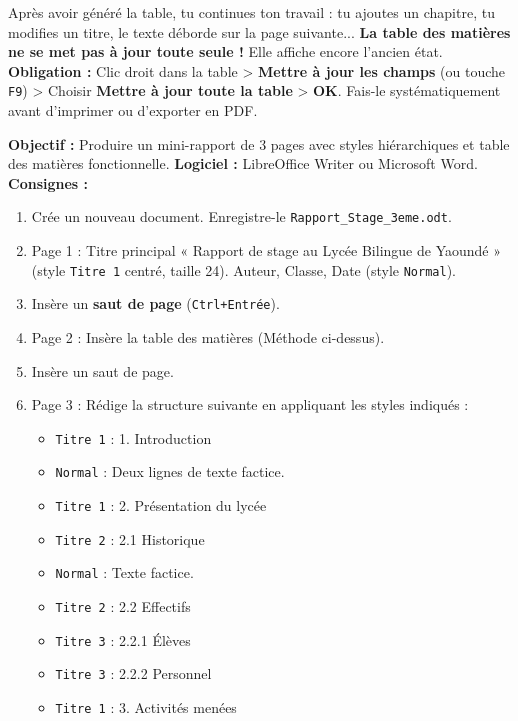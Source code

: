 \documentclass[11pt]{article}
\begin{document}
\begin{attention}
Après avoir généré la table, tu continues ton travail : tu ajoutes un chapitre, tu modifies un titre, le texte déborde sur la page suivante... \textbf{La table des matières ne se met pas à jour toute seule !} Elle affiche encore l'ancien état. \textbf{Obligation :} Clic droit dans la table > \textbf{Mettre à jour les champs} (ou touche \texttt{F9}) > Choisir \textbf{Mettre à jour toute la table} > \textbf{OK}. Fais-le systématiquement avant d'imprimer ou d'exporter en PDF.
\end{attention}

\begin{experience}
\textbf{Objectif :} Produire un mini-rapport de 3 pages avec styles hiérarchiques et table des matières fonctionnelle.
\textbf{Logiciel :} LibreOffice Writer ou Microsoft Word.
\textbf{Consignes :}
\begin{enumerate}
    \item Crée un nouveau document. Enregistre-le \texttt{Rapport\_Stage\_3eme.odt}.
    \item Page 1 : Titre principal « Rapport de stage au Lycée Bilingue de Yaoundé » (style \texttt{Titre 1} centré, taille 24). Auteur, Classe, Date (style \texttt{Normal}).
    \item Insère un \textbf{saut de page} (\texttt{Ctrl+Entrée}).
    \item Page 2 : Insère la table des matières (Méthode ci-dessus).
    \item Insère un saut de page.
    \item Page 3 : Rédige la structure suivante en appliquant les styles indiqués :
    \begin{itemize}
        \item \texttt{Titre 1} : 1. Introduction
        \item \texttt{Normal} : Deux lignes de texte factice.
        \item \texttt{Titre 1} : 2. Présentation du lycée
        \item \texttt{Titre 2} : 2.1 Historique
        \item \texttt{Normal} : Texte factice.
        \item \texttt{Titre 2} : 2.2 Effectifs
        \item \texttt{Titre 3} : 2.2.1 Élèves
        \item \texttt{Titre 3} : 2.2.2 Personnel
        \item \texttt{Titre 1} : 3. Activités menées

\end{itemize}
\end{enumerate}
\end{experience}
\end{document}
